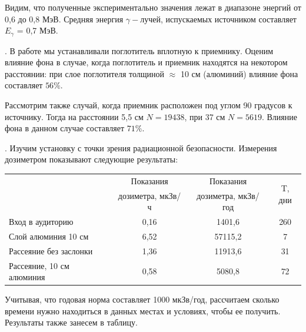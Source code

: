 \documentclass[a4paper,12pt]{article} %
\begin{document}
\medskip

\noindent Видим, что полученные экспериментально значения лежат в диапазоне энергий от 0,6 до 0,8 МэВ. Средняя энергия $\gamma-$лучей, испускаемых источником составляет $E_{\gamma}$ = 0,7 МэВ.


\medskip

. В работе мы устанавливали поглотитель вплотную к приемнику. Оценим влияние фона в случае, когда поглотитель и приемник находятся на некотором расстоянии: при слое поглотителя толщиной $\approx$ 10 см (алюминий) влияние фона составляет $56\%$. 

\medskip

\noindent Рассмотрим также случай, когда приемник расположен под углом 90 градусов к источнику. Тогда на расстоянии 5,5 см $N = 19438$, при 37 см $N = 5619$. Влияние фона в данном случае составляет $71\%$.

\medskip

. Изучим установку с точки зрения радиационной безопасности. Измерения дозиметром показывают следующие результаты:

\medskip

\begin{table}[h!]
\begin{tabular}{|l|c|c|c|}
\hline
\multirow{2}{*}{}          & Показания         & Показания           & \multirow{2}{*}{T, дни} \\
                           & дозиметра, мкЗв/ч & дозиметра, мкЗв/год &                         \\ \hline
Вход в аудиторию           & 0,16              & 1401,6              & 260                     \\ \hline
Слой алюминия 10 см        & 6,52              & 57115,2             & 7                       \\ \hline
Рассеяние без заслонки     & 1,36              & 11913,6             & 31                      \\ \hline
Рассеяние, 10 см алюминия & 0,58              & 5080,8              & 72                      \\ \hline
\end{tabular}
\end{table}

\medskip

\noindent Учитывая, что годовая норма составляет 1000 мкЗв/год, рассчитаем сколько времени нужно находиться в данных местах и условиях, чтобы ее получить. Результаты также занесем в таблицу.
\end{document}
